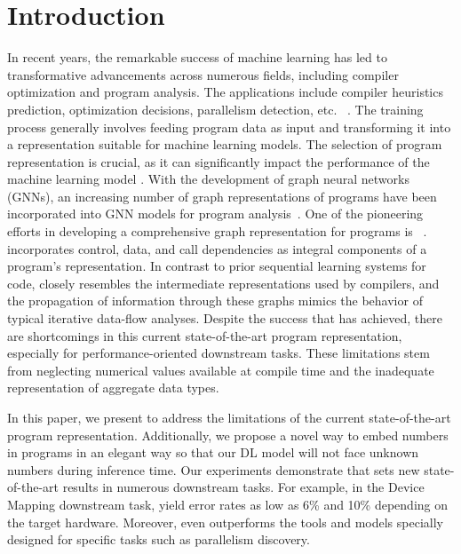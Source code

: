 \section{Introduction}
\label{sec:introduction}
\vspace{-8pt}
In recent years, the remarkable success of machine learning has led to transformative advancements across numerous fields, including compiler optimization and program analysis. 
The applications include compiler heuristics prediction, optimization decisions, parallelism detection, etc. ~\cite{allamanis2018survey, cummins2022compilergym}.
The training process generally involves feeding program data as input and transforming it into a representation suitable for machine learning models. The selection of program representation is crucial, as it can significantly impact the performance of the machine learning model \cite{chen2019literature}.
With the development of graph neural networks (GNNs), an increasing number of graph representations of programs have been incorporated into GNN models for program analysis~\cite{allamanis2017learning, li2019graph, chen2022multi}.
One of the pioneering efforts in developing a comprehensive graph representation for programs is \programl ~\cite{cummins2020programl}.
\programl incorporates control, data, and call dependencies as integral components of a program's representation.
In contrast to prior sequential learning systems for code, \programl closely resembles the intermediate representations used by compilers, and the propagation of information through these graphs mimics the behavior of typical iterative data-flow analyses.
Despite the success that \programl has achieved, there are shortcomings in this current state-of-the-art program representation, especially for performance-oriented downstream tasks.
These limitations stem from neglecting numerical values available at compile time and the inadequate representation of aggregate data types.

In this paper, we present \ourtool to address the limitations of the current state-of-the-art program representation.
Additionally, we propose a novel way to embed numbers in programs in an elegant way so that our DL model will not face unknown numbers during inference time. Our experiments demonstrate that \ourtool sets new state-of-the-art results in numerous downstream tasks.
For example, in the Device Mapping downstream task, \ourtool yield error rates as low as 6\% and 10\% depending on the target hardware.
Moreover, \ourtool even outperforms the tools and models specially designed for specific tasks such as parallelism discovery.  

